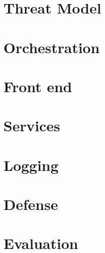 \documentclass[letterpaper,twocolumn,10pt]{article}
\begin{document}
\section{Threat Model} \label{Threat Model}


\section{Orchestration} \label{Orchestration}


\section{Front end} \label{Front End}


\section{Services} \label{Services}


\section{Logging} \label{Logging}


\section{Defense} \label{Defense}



\section{Evaluation} \label{Evaluation}
\end{document}
